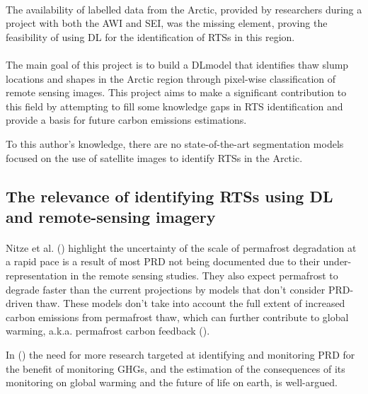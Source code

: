 \paragraph{}
The availability of labelled data from the Arctic, provided by researchers during a project with both the \gls{AWI} and \gls{SEI}, was the missing element, proving the feasibility of using DL for the identification of \gls{RTS}s in this region.

\paragraph{}
The main goal of this project is to build a \gls{DL}model that identifies thaw slump locations and shapes in the Arctic region through pixel-wise classification of remote sensing images. This project aims to make a significant contribution to this field by attempting to fill some knowledge gaps in \gls{RTS} identification and provide a basis for future carbon emissions estimations.

To this author's knowledge, there are no state-of-the-art segmentation models focused on the use of satellite images to identify \gls{RTS}s in the Arctic.


\subsection{The relevance of identifying \gls{RTS}s using \gls{DL} and remote-sensing imagery} \label{rts_ref}
\paragraph{}

Nitze et al. (\cite{articleing2018}) highlight the uncertainty of the scale of permafrost degradation at a rapid pace is a result of most \gls{PRD} not being documented due to their under-representation in the remote sensing studies. 
They also expect permafrost to degrade faster than the current projections by models that don't consider \gls{PRD}-driven thaw. These models don't take into account the full extent of increased carbon emissions from permafrost thaw, which can further contribute to global warming, \gls{a.k.a.} permafrost carbon feedback (\cite{articlecarbonfeedback}).

In (\cite{book1}) the need for more research targeted at identifying and monitoring \gls{PRD} for the benefit of monitoring \gls{GHGs}, and the estimation of the consequences of its monitoring on global warming and the future of life on earth, is well-argued.

